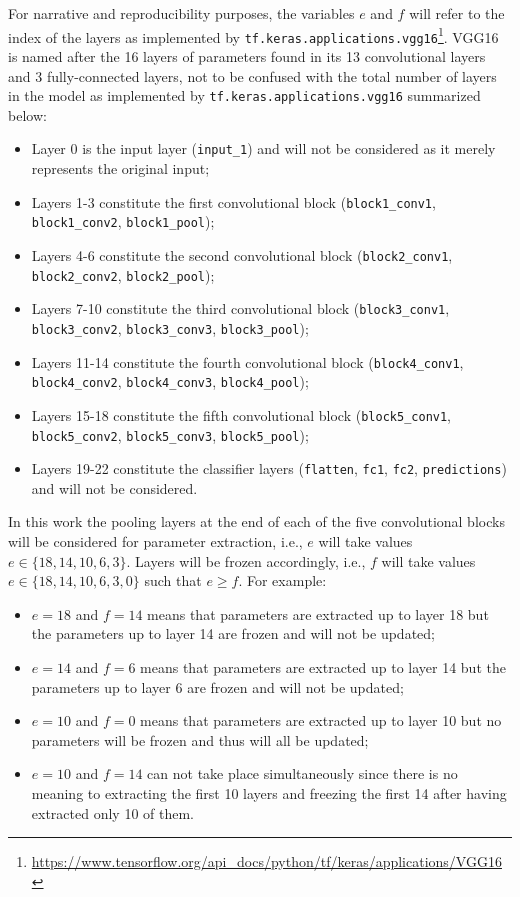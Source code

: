 For narrative and reproducibility purposes, the variables $e$ and $f$ will refer to the index of the layers as implemented by \verb|tf.keras.applications.vgg16|\footnote{\url{https://www.tensorflow.org/api_docs/python/tf/keras/applications/VGG16}}. VGG16 is named after the 16 layers of parameters found in its 13 convolutional layers and 3 fully-connected layers, not to be confused with the total number of layers in the model as implemented by \verb|tf.keras.applications.vgg16| summarized below:

\begin{itemize}
    \item Layer 0 is the input layer (\verb|input_1|) and will not be considered as it merely represents the original input;
    \item Layers 1-3 constitute the first convolutional block (\verb|block1_conv1|, \verb|block1_conv2|, \verb|block1_pool|);
    \item Layers 4-6 constitute the second convolutional block (\verb|block2_conv1|, \verb|block2_conv2|, \verb|block2_pool|);
    \item Layers 7-10 constitute the third convolutional block (\verb|block3_conv1|, \verb|block3_conv2|, \verb|block3_conv3|, \verb|block3_pool|);
    \item Layers 11-14 constitute the fourth convolutional block (\verb|block4_conv1|, \verb|block4_conv2|, \verb|block4_conv3|, \verb|block4_pool|);
    \item Layers 15-18 constitute the fifth convolutional block (\verb|block5_conv1|, \verb|block5_conv2|, \verb|block5_conv3|, \verb|block5_pool|);
    \item Layers 19-22 constitute the classifier layers (\verb|flatten|, \verb|fc1|, \verb|fc2|, \verb|predictions|) and will not be considered.
\end{itemize}

In this work the pooling layers at the end of each of the five convolutional blocks will be considered for parameter extraction, i.e., $e$ will take values $e \in \{18, 14, 10, 6, 3\}$. Layers will be frozen accordingly, i.e., $f$ will take values $e \in \{18, 14, 10, 6, 3, 0\}$ such that $e \geq f$. For example:

\begin{itemize}
    \item $e = 18$ and $f = 14$ means that parameters are extracted up to layer 18 but the parameters up to layer 14 are frozen and will not be updated;
    \item $e = 14$ and $f = 6$ means that parameters are extracted up to layer 14 but the parameters up to layer 6 are frozen and will not be updated;
    \item $e = 10$ and $f = 0$ means that parameters are extracted up to layer 10 but no parameters will be frozen and thus will all be updated;
    \item $e = 10$ and $f = 14$ can not take place simultaneously since there is no meaning to extracting the first 10 layers and freezing the first 14 after having extracted only 10 of them.
\end{itemize}

